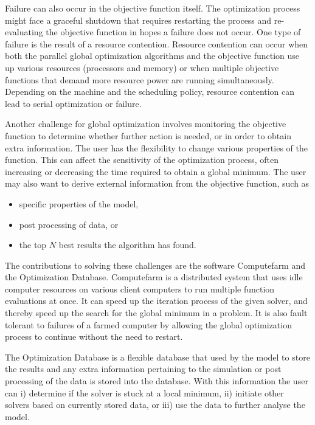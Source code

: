 Failure can also occur in the objective function itself. The optimization process might face a graceful shutdown that requires restarting the process and re-evaluating the objective function in hopes a failure does not occur. One type of failure is the result of a resource contention. Resource contention can occur when both the parallel global optimization algorithms and the objective function use up various resources (processors and memory) or when multiple objective functions that demand more
resource power are running simultaneously. Depending on the machine and the scheduling policy, resource contention can lead to serial optimization or failure. 

Another challenge for global optimization involves monitoring the objective function to determine whether further action is needed, or in order to obtain extra information. The user has the flexibility to change various properties of the function. This can affect the sensitivity of the optimization process, often increasing or decreasing the time required to obtain a global minimum. The user may also want to derive external information from the objective function, such as 
\begin{itemize}
  \item specific properties of the model, 
  \item post processing of data, or
  \item the top $N$ best results the algorithm has found.
\end{itemize}

The contributions to solving these challenges are the software Computefarm and the Optimization Database. Computefarm is a distributed system that uses idle computer resources on various client computers to run multiple function evaluations at once. It can speed up the iteration process of the given solver, and thereby speed up the search for the global minimum in a problem. It is also fault tolerant to failures of a farmed computer by allowing the global optimization process to continue without
the need to restart. 

The Optimization Database is a flexible database that used by the model to store the results and any extra information pertaining to the simulation or post processing of the data is stored into the database. With this information the user can i) determine if the solver is stuck at a local minimum, ii) initiate other solvers based on currently stored data, or iii) use the data to further analyse the model. 

